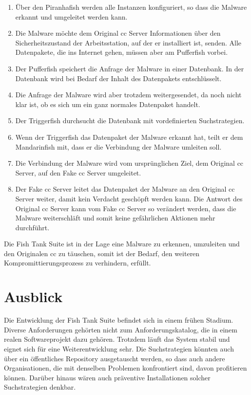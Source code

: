 \begin{enumerate}
	\item Über den Piranhafish werden alle Instanzen konfiguriert, so dass die Malware erkannt und umgeleitet werden kann.
	\item Die Malware möchte dem Original \gls{cc} Server Informationen über den Sicherheitszustand der Arbeitsstation, auf der er installiert ist, senden. Alle Datenpakete, die ins Internet gehen, müssen aber am Pufferfish vorbei.
	\item Der Pufferfish speichert die Anfrage der Malware in einer Datenbank. In der Datenbank wird bei Bedarf der Inhalt des Datenpakets entschlüsselt.
	\item Die Anfrage der Malware wird aber trotzdem weitergesendet, da noch nicht klar ist, ob es sich um ein ganz normales Datenpaket handelt.
	\item Der Triggerfish durchsucht die Datenbank mit vordefinierten Suchstrategien.
	\item Wenn der Triggerfish das Datenpaket der Malware erkannt hat, teilt er dem Mandarinfish mit, dass er die Verbindung der Malware umleiten soll.
	\item Die Verbindung der Malware wird vom ursprünglichen Ziel, dem Original \gls{cc} Server, auf den Fake \gls{cc} Server umgeleitet.
	\item Der Fake \gls{cc} Server leitet das Datenpaket der Malware an den Original \gls{cc} Server weiter, damit kein Verdacht geschöpft werden kann. Die Antwort des Original \gls{cc} Server kann vom Fake \gls{cc} Server so verändert werden, dass die Malware weiterschläft und somit keine gefährlichen Aktionen mehr durchführt.
\end{enumerate}

Die Fish Tank Suite ist in der Lage eine Malware zu erkennen, umzuleiten und den Originalen \gls{cc} zu täuschen, somit ist der Bedarf, den weiteren Kompromittierungsprozess zu verhindern, erfüllt.

\section{Ausblick}
Die Entwicklung der Fish Tank Suite befindet sich in einem frühen Stadium. Diverse Anforderungen gehörten nicht zum Anforderungskatalog, die in einem realen Softwareprojekt dazu gehören. Trotzdem läuft das System stabil und eignet sich für eine Weiterentwicklung sehr. Die Suchstrategien könnten auch über ein öffentliches Repository ausgetauscht werden, so dass auch andere Organisationen, die mit denselben Problemen konfrontiert sind, davon profitieren können. Darüber hinaus wären auch präventive Installationen solcher Suchstrategien denkbar.